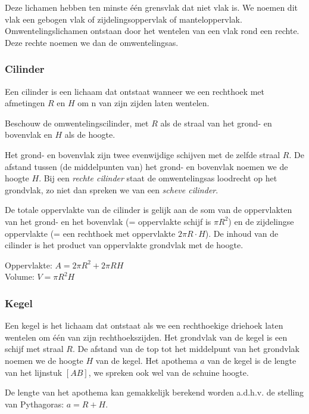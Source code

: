 Deze lichamen hebben ten minste \'e\'en grensvlak dat niet vlak is. We noemen dit vlak een gebogen vlak of zijdelingsoppervlak of manteloppervlak. Omwentelingslichamen ontstaan door het wentelen van een vlak rond een rechte. Deze rechte noemen we dan de omwentelingsas.

\subsubsection{Cilinder}
\begin{definitie}
	Een cilinder is een lichaam dat ontstaat wanneer we een rechthoek met afmetingen  $R$ en $H$ om n van zijn zijden laten wentelen.
\end{definitie}
 Beschouw de omwentelingscilinder, met $R$ als de straal van het grond- en bovenvlak en $H$ als de hoogte.

Het grond- en bovenvlak zijn twee evenwijdige schijven met de zelfde straal $R$. De afstand tussen (de middelpunten van) het grond- en bovenvlak noemen we de hoogte $H$. Bij een \emph{rechte cilinder} staat de omwentelingsas loodrecht op het grondvlak, zo niet dan spreken we van een \emph{scheve cilinder}.

De totale oppervlakte van de cilinder is gelijk aan de som van de oppervlakten van het grond- en het bovenvlak (= oppervlakte schijf is $\pi R^2$) en de zijdelingse oppervlakte (= een rechthoek met oppervlakte $2\pi R\cdot H$). De inhoud van de cilinder is het product van oppervlakte grondvlak met de hoogte.



\begin{ftonthoud}
	
		Oppervlakte: $A=2\pi R^2 + 2\pi RH$
		\\
		Volume: $V=\pi R^2 H$
\end{ftonthoud}

\subsubsection{Kegel}
\begin{definitie}
	Een kegel is het lichaam dat ontstaat als we een rechthoekige driehoek laten wentelen om \'e\'en van zijn rechthoekszijden. Het grondvlak van de kegel is een schijf met straal $R$. De afstand van de top tot het middelpunt van het grondvlak noemen we de hoogte $H$ van de kegel. Het apothema $a$ van de kegel is de lengte van het lijnstuk $[AB]$, we spreken ook wel van de schuine hoogte.
\end{definitie}
De lengte van het apothema kan gemakkelijk berekend worden a.d.h.v. de stelling van Pythagoras: $a=R+H$.

